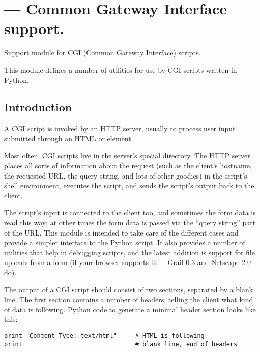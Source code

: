 \section{ ---
         Common Gateway Interface support.}




Support module for CGI (Common Gateway Interface) scripts.%

This module defines a number of utilities for use by CGI scripts
written in Python.

\subsection{Introduction}

A CGI script is invoked by an HTTP server, usually to process user
input submitted through an HTML  or  element.

Most often, CGI scripts live in the server's special 
directory.  The HTTP server places all sorts of information about the
request (such as the client's hostname, the requested URL, the query
string, and lots of other goodies) in the script's shell environment,
executes the script, and sends the script's output back to the client.

The script's input is connected to the client too, and sometimes the
form data is read this way; at other times the form data is passed via
the ``query string'' part of the URL.  This module is intended
to take care of the different cases and provide a simpler interface to
the Python script.  It also provides a number of utilities that help
in debugging scripts, and the latest addition is support for file
uploads from a form (if your browser supports it --- Grail 0.3 and
Netscape 2.0 do).

The output of a CGI script should consist of two sections, separated
by a blank line.  The first section contains a number of headers,
telling the client what kind of data is following.  Python code to
generate a minimal header section looks like this:

\begin{verbatim}
print "Content-Type: text/html"     # HTML is following
print                               # blank line, end of headers
\end{verbatim}

